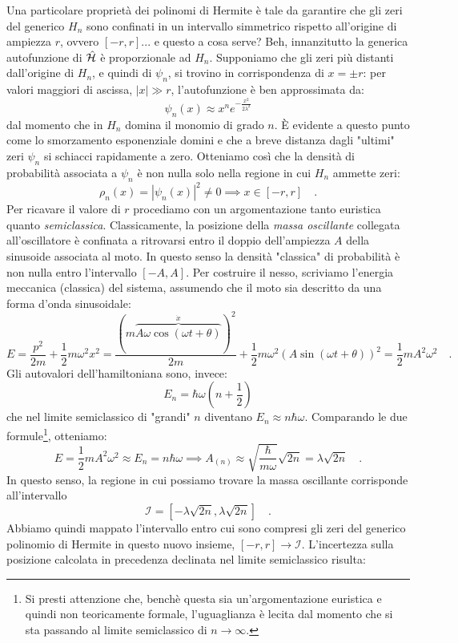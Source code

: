 Una particolare proprietà dei polinomi di Hermite è tale da garantire che gli zeri del generico $H_n$ sono confinati in un intervallo simmetrico rispetto all'origine di ampiezza $r$, ovvero $[-r, r]$... e questo a cosa serve? Beh, innanzitutto la generica autofunzione di $\hat{\mathcal{H}}$ è proporzionale ad $H_n$. Supponiamo che gli zeri più distanti dall'origine di $H_n$, e quindi di $\psi_n$, si trovino in corrispondenza di $x = \pm r$: per valori maggiori di ascissa, $|x| \gg r$, l'autofunzione è ben approssimata da:
\[
    \psi_n(x) \approx x^n e^{-\frac{x^2}{2\lambda^2}}
\] 
dal momento che in $H_n$ domina il monomio di grado $n$. È evidente a questo punto come lo smorzamento esponenziale domini e che a breve distanza dagli "ultimi" zeri $\psi_n$ si schiacci rapidamente a zero. Otteniamo così che la densità di probabilità associata a $\psi_n$ è non nulla solo nella regione in cui $H_n$ ammette zeri:
\[
    \rho_n(x) = |\psi_n(x)|^2 \neq 0 \implies x \in [-r,r] \quad.
\]
Per ricavare il valore di $r$ procediamo con un argomentazione tanto euristica quanto \emph{semiclassica}. Classicamente, la posizione della \emph{massa oscillante} collegata all'oscillatore è confinata a ritrovarsi entro il doppio dell'ampiezza $A$ della sinusoide associata al moto. In questo senso la densità "classica" di probabilità è non nulla entro l'intervallo $[-A, A]$. Per costruire il nesso, scriviamo l'energia meccanica (classica) del sistema, assumendo che il moto sia descritto da una forma d'onda sinusoidale:
\[
    E = \frac{p^2}{2m} + \frac{1}{2}m\omega^2 x^2 = \frac{(m\overbrace{A\omega\cos(\omega t + \theta)}^{\dot{x}})^2}{2m} + \frac{1}{2}m\omega^2 (A\sin(\omega t + \theta))^2 = \frac{1}{2}m A^2 \omega^2 \quad.
\]
Gli autovalori dell'hamiltoniana sono, invece:
\[
    E_n = \hbar \omega \left(n+\frac{1}{2}\right)
\]
che nel limite semiclassico di "grandi" $n$ diventano $E_n \approx n\hbar\omega$. Comparando le due formule\footnote{Si presti attenzione che, benchè questa sia un'argomentazione euristica e quindi non teoricamente formale, l'uguaglianza è lecita dal momento che si sta passando al limite semiclassico di $n \to \infty$.}, otteniamo:
\[
    E = \frac{1}{2}m A^2 \omega^2 \approx E_n = n\hbar\omega \implies A_{(n)} \approx \sqrt{\frac{\hbar}{m\omega}}\sqrt{2n}  = \lambda \sqrt{2n} \quad. 
\]
In questo senso, la regione in cui possiamo trovare la massa oscillante corrisponde all'intervallo 
\[
    \mathcal{I} = \left[ -\lambda \sqrt{2n}, \lambda \sqrt{2n} \right] \quad.
\]
Abbiamo quindi mappato l'intervallo entro cui sono compresi gli zeri del generico polinomio di Hermite in questo nuovo insieme, $[-r,r] \to \mathcal{I}$. L'incertezza sulla posizione calcolata in precedenza declinata nel limite semiclassico risulta:
